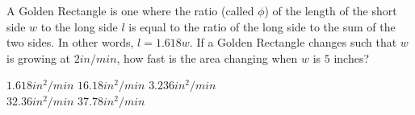 \begin{questions}
    \question A Golden Rectangle is one where the ratio (called $\phi$) of the length of the short side $w$ to the long side $l$ is equal to the ratio of the long side to the sum of the two sides. In other words, $l = 1.618w$. If a Golden Rectangle changes such that $w$ is growing at $2 \si{in \per min}$, how fast is the area changing when $w$ is $5$ inches? \\

    \begin{oneparchoices}
        \choice $1.618 \si{in^2 \per min}$
        \choice $16.18 \si{in^2 \per min}$
        \choice $3.236 \si{in^2 \per min}$ \\[11pt]
        \makebox[0.23\textwidth] \choice $32.36 \si{in^2 \per min}$
        \makebox[0.23\textwidth] \choice $37.78 \si{in^2 \per min}$
    \end{oneparchoices} \par \horizontalline
\end{questions}